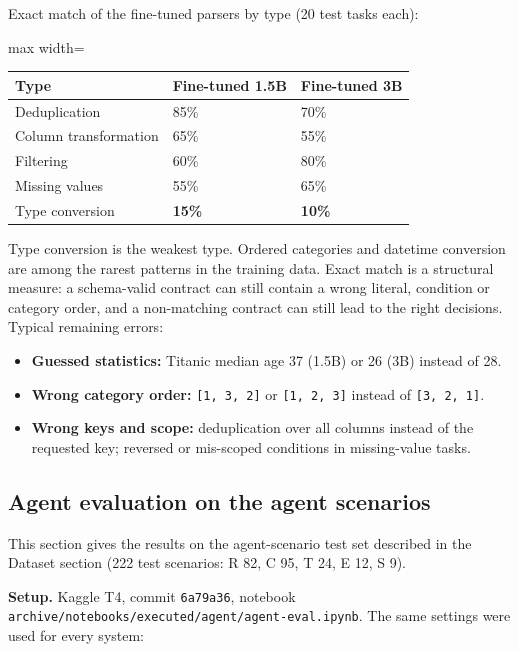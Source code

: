 \documentclass[11pt]{article}
\providecommand{\tightlist}{\setlength{\itemsep}{0pt}\setlength{\parskip}{0pt}}
\begin{document}
Exact match of the fine-tuned parsers by type (20 test tasks each):

\begin{table}[!tp]
\centering\footnotesize\setlength{\tabcolsep}{3pt}\renewcommand{\arraystretch}{1.1}
\begin{adjustbox}{max width=\textwidth}\begin{tabular}{lll}
\toprule
\textbf{Type} & \textbf{Fine-tuned 1.5B} & \textbf{Fine-tuned 3B} \\
\midrule
Deduplication & 85\% & 70\% \\
Column transformation & 65\% & 55\% \\
Filtering & 60\% & 80\% \\
Missing values & 55\% & 65\% \\
Type conversion & \textbf{15\%} & \textbf{10\%} \\
\bottomrule
\end{tabular}\end{adjustbox}
\end{table}

Type conversion is the weakest type. Ordered categories and datetime
conversion are among the rarest patterns in the training data. Exact
match is a structural measure: a schema-valid contract can still contain
a wrong literal, condition or category order, and a non-matching
contract can still lead to the right decisions. Typical remaining
errors:

\begin{itemize}
\tightlist
\item
  \textbf{Guessed statistics:} Titanic median age 37 (1.5B) or 26 (3B)
  instead of 28.
\item
  \textbf{Wrong category order:} \texttt{[1, 3, 2]} or
  \texttt{[1, 2, 3]} instead of \texttt{[3, 2, 1]}.
\item
  \textbf{Wrong keys and scope:} deduplication over all columns instead
  of the requested key; reversed or mis-scoped conditions in
  missing-value tasks.
\end{itemize}

\subsection{Agent evaluation on the agent scenarios}

This section gives the results on the agent-scenario test set described
in the Dataset section (222 test scenarios: R 82, C 95, T 24, E 12, S
9).

\textbf{Setup.} Kaggle T4, commit \texttt{6a79a36}, notebook
\texttt{archive/\allowbreak{}notebooks/\allowbreak{}executed/\allowbreak{}agent/\allowbreak{}agent-eval.\allowbreak{}ipynb}.
The same settings were used for every system:
\end{document}
